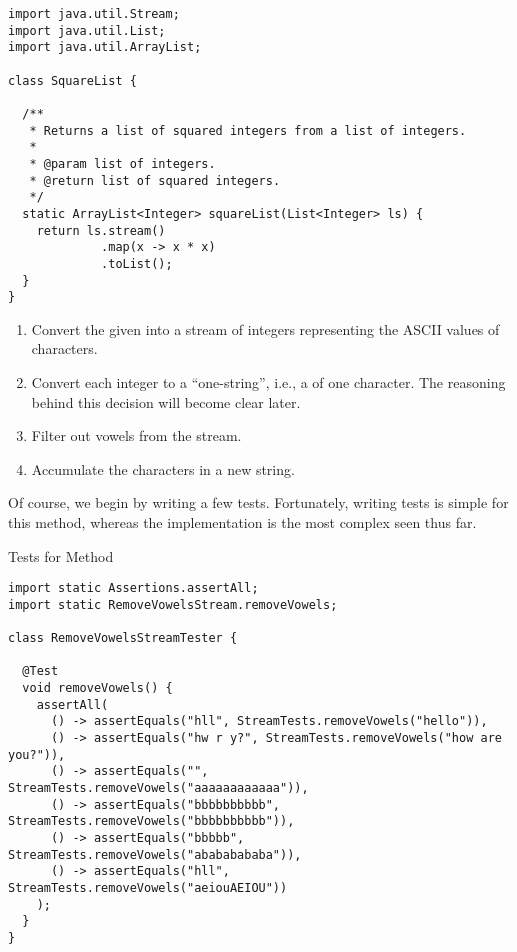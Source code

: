 \begin{cl}[]{}
\begin{lstlisting}[language=MyJava]
import java.util.Stream;
import java.util.List;
import java.util.ArrayList;

class SquareList {

  /**
   * Returns a list of squared integers from a list of integers.
   *
   * @param list of integers.
   * @return list of squared integers.
   */
  static ArrayList<Integer> squareList(List<Integer> ls) {
    return ls.stream()
             .map(x -> x * x)
             .toList();
  }
}
\end{lstlisting}    
\end{cl}


\begin{enumerate}
    \item Convert the given  into a stream of integers representing the ASCII values of characters.
    \item Convert each integer to a ``one-string'', i.e., a  of one character. The reasoning behind this decision will become clear later.
    \item Filter out vowels from the stream.
    \item Accumulate the characters in a new string.
\end{enumerate}

Of course, we begin by writing a few tests. Fortunately, writing tests is simple for this method, whereas the implementation is the most complex seen thus far.

\begin{cl}[]{Tests for  Method}
\begin{lstlisting}[language=MyJava]
import static Assertions.assertAll;
import static RemoveVowelsStream.removeVowels;

class RemoveVowelsStreamTester {
  
  @Test
  void removeVowels() {
    assertAll(
      () -> assertEquals("hll", StreamTests.removeVowels("hello")),
      () -> assertEquals("hw r y?", StreamTests.removeVowels("how are you?")),
      () -> assertEquals("", StreamTests.removeVowels("aaaaaaaaaaaa")),
      () -> assertEquals("bbbbbbbbbb", StreamTests.removeVowels("bbbbbbbbbb")),
      () -> assertEquals("bbbbb", StreamTests.removeVowels("abababababa")),
      () -> assertEquals("hll", StreamTests.removeVowels("aeiouAEIOU"))
    );
  }
}
\end{lstlisting}
\end{cl}

